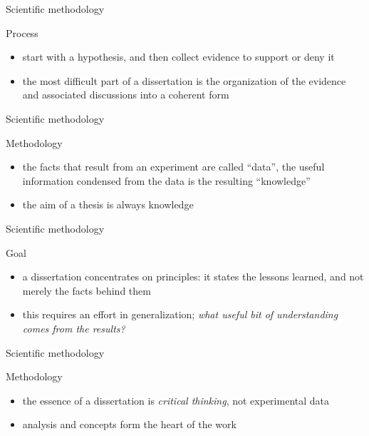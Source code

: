 \documentclass{beamer}
\begin{document}
\begin{frame}{Scientific methodology}
\begin{block}{Process}
\begin{itemize}
\item start with a hypothesis, and then collect evidence to support or deny it
\item the most difficult part of a dissertation is the organization of the evidence and associated discussions into a coherent form
\end{itemize}
\end{block}
\end{frame}


\begin{frame}{Scientific methodology}
\begin{block}{Methodology}
\begin{itemize}
\item the facts that result from an experiment are called ``data'', the useful information condensed from the data is the resulting ``knowledge''
\item the aim of a thesis is always knowledge
\end{itemize}
\end{block}
\end{frame}


\begin{frame}{Scientific methodology}
\begin{block}{Goal}
\begin{itemize}
\item a dissertation concentrates on principles: it states the lessons learned, and not merely the facts behind them
\item this requires an effort in generalization; \textit{what useful bit of understanding comes from the results?}
\end{itemize}
\end{block}
\end{frame}


\begin{frame}{Scientific methodology}
\begin{block}{Methodology}
\begin{itemize}
\item the essence of a dissertation is \textit{critical thinking}, not experimental data
\item analysis and concepts form the heart of the work
\end{itemize}
\end{block}
\end{frame}
\end{document}
